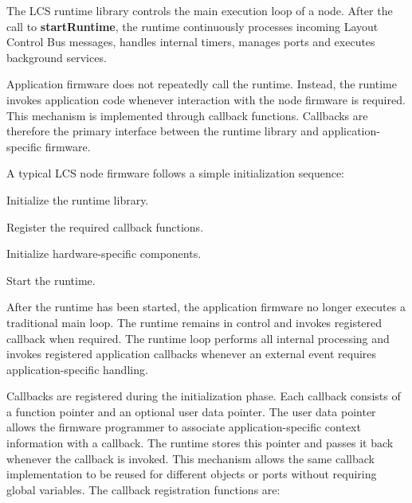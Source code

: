 %

The LCS runtime library controls the main execution loop of a node. After the 
call to \textbf{startRuntime}, the runtime continuously processes incoming 
Layout Control Bus messages, handles internal timers, manages ports and executes 
background services.

Application firmware does not repeatedly call the runtime. Instead, the runtime 
invokes application code whenever interaction with the node firmware is required. 
This mechanism is implemented through callback functions. Callbacks are therefore 
the primary interface between the runtime library and application-specific firmware.


A typical LCS node firmware follows a simple initialization sequence:

\begin{smallGapItemize}
    \item Initialize the runtime library.
    \item Register the required callback functions.
    \item Initialize hardware-specific components.
    \item Start the runtime.
\end{smallGapItemize}

After the runtime has been started, the application firmware no longer executes a
traditional main loop. The runtime remains in control and invokes registered 
callback when required. The runtime loop performs all internal processing and 
invokes registered application callbacks whenever an external event requires 
application-specific handling.


Callbacks are registered during the initialization phase. Each callback consists 
of a function pointer and an optional user data pointer. The user data pointer 
allows the firmware programmer to associate application-specific context 
information with a callback. The runtime stores this pointer and passes it back
whenever the callback is invoked. This mechanism allows the same callback 
implementation to be reused for different objects or ports without requiring 
global variables. The callback registration functions are:

